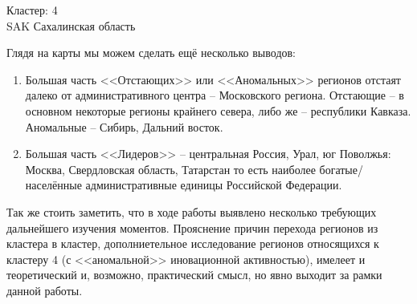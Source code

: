 \documentclass[11pt]{article}
\begin{document}
Кластер:  4 \\
SAK Сахалинская область

\par\bigskip

Глядя на карты мы можем сделать ещё несколько выводов:

\begin{enumerate}
\item Большая часть <<Отстающих>> или <<Аномальных>> регионов отстаят далеко от административного центра -- Московского региона. Отстающие -- в основном некоторые регионы крайнего севера, либо же -- республики Кавказа. Аномальные -- Сибирь, Дальний восток.
\item Большая часть <<Лидеров>> -- центральная Россия, Урал, юг Поволжья: Москва, Свердловская область, Татарстан то есть наиболее богатые/населённые  административные единицы Российской Федерации.
\end{enumerate}

Так же стоить заметить, что в ходе работы выявлено несколько требующих
дальнейшего изучения моментов. Прояснение причин перехода регионов из
кластера в кластер, дополниетельное исследование регионов относящихся к
кластеру 4 (с <<аномальной>> иновационной активностью), имелеет и
теоретический и, возможно, практический смысл, но явно выходит за рамки
данной работы.

\newpage

\end{document}
